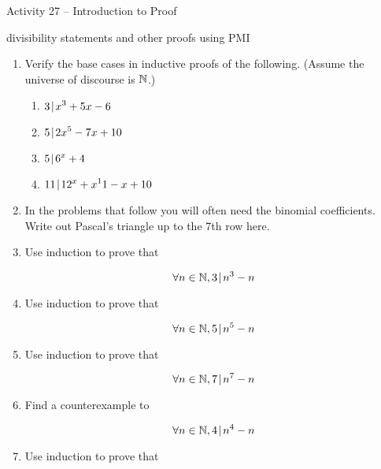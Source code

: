 \documentclass{amsart}
\newcommand{\vsp}{\rule[-12pt]{0pt}{48pt}}
\begin{document}
\thispagestyle{empty}

\centerline{\Large Activity 27 -- Introduction to Proof}
\centerline{\large divisibility statements and other proofs using PMI}

\bigskip
\Large


\begin{enumerate}

\item Verify the base cases in inductive proofs of the following.  (Assume the universe of discourse is ${\mathbb N}$.)

\begin{enumerate}
	\item \vsp $\displaystyle 3 \!\mid\! x^3 + 5x - 6$
	\item \vsp $\displaystyle 5 \!\mid\! 2x^5 - 7x + 10$
	\item \vsp $\displaystyle 5 \!\mid\! 6^x + 4$
	\item \vsp $\displaystyle 11 \!\mid\! 12^x + x^11 - x + 10$
\end{enumerate}

\vsp

\item In the problems that follow you will often need the binomial coefficients.  Write out Pascal's triangle up to the 7th row here.

\vfill

\newpage

\item Use induction to prove that

\[ \forall n \in {\mathbb N},  3 \!\mid\! n^3 - n \]

\vfill

\item Use induction to prove that

\[ \forall n \in {\mathbb N},  5 \!\mid\! n^5 - n \]

\vfill

\newpage

\item Use induction to prove that

\[ \forall n \in {\mathbb N},  7 \!\mid\! n^7 - n \]

\vfill

\item Find a counterexample to

\[ \forall n \in {\mathbb N},  4 \!\mid\! n^4 - n \]

\vfill

\newpage

\item Use induction to prove that


\end{enumerate}
\end{document}
